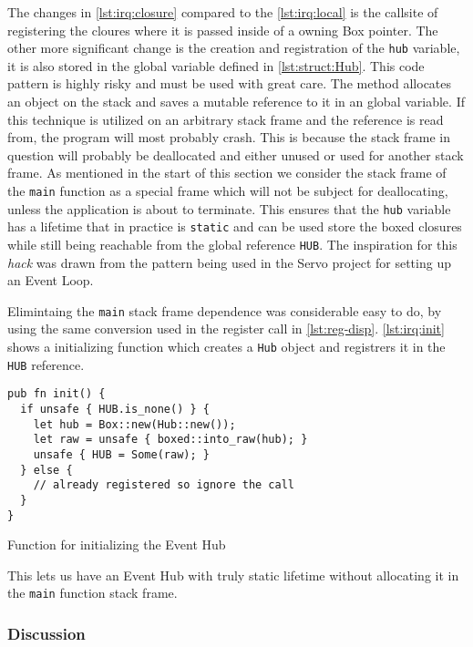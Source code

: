 The changes in \autoref{lst:irq:closure} compared to the \autoref{lst:irq:local} is the callsite of registering the cloures where it is passed inside of a owning Box pointer. 
The other more significant change is the creation and registration of the \texttt{hub} variable, it is also stored in the global variable defined in \autoref{lst:struct:Hub}.
This code pattern is highly risky and must be used with great care.
The method allocates an object on the stack and saves a mutable reference to it in an global variable.
If this technique is utilized on an arbitrary stack frame and the reference is read from, the program will most probably crash.
This is because the stack frame in question will probably be deallocated and either unused or used for another stack frame.
As mentioned in the start of this section we consider the stack frame of the \texttt{main} function as a special frame which will not be subject for deallocating, unless the application is about to terminate.
This ensures that the \texttt{hub} variable has a lifetime that in practice is \texttt{static} and can be used store the boxed closures while still being reachable from the global reference \texttt{HUB}.
The inspiration for this \textit{hack} was drawn from the pattern being used in the Servo \cite{web:servo} project for setting up an Event Loop.

Elimintaing the \texttt{main} stack frame dependence was considerable easy to do, by using the same conversion used in the register call in \autoref{lst:reg-disp}.
\autoref{lst:irq:init} shows a initializing function which creates a \texttt{Hub} object and registrers it in the \texttt{HUB} reference.

\begin{listing}[H]
  \begin{verbatim}
pub fn init() {
  if unsafe { HUB.is_none() } {
    let hub = Box::new(Hub::new());
    let raw = unsafe { boxed::into_raw(hub); }
    unsafe { HUB = Some(raw); }
  } else {
    // already registered so ignore the call
  }
}
  \end{verbatim}
  \caption{Function for initializing the Event Hub}
  \label{lst:irq:init}
\end{listing}

This lets us have an Event Hub with truly static lifetime without allocating it in the \texttt{main} function stack frame.

\subsubsection{Discussion}

